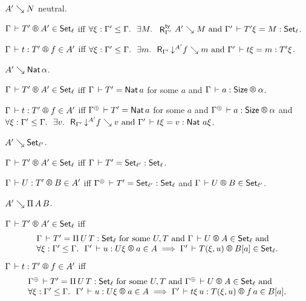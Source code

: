 \documentclass[acmlarge,review,anonymous]{acmart}\settopmatter{printfolios=true}
\begin{document}
\begin{caselist}

\vspace{2ex}
\nextcase $A' \evalsto N$ neutral.

  \noindent
  $\LRT{\Gamma}{T'}{A'}\ell$ iff
  $\forall \xi : \Gamma' \leq \Gamma.\ \ \exists M.\ \ \RTy{\Gamma'}{A'}M \mand \Gamma' \der T'\xi = M : \Set[\ell]$.

  \noindent
  $\LR{\Gamma}{t}{T'}{f}{A'}$ iff
  $\forall \xi : \Gamma' \leq \Gamma.\ \
   \exists m. \ \
   \R {\Gamma'} {\down {A'} f} m \mand
   \Gamma' \der t\xi = m : T'\xi$.

\vspace{2ex}
\nextcase $A' \evalsto \Nat \alpha$.

  \noindent
  $\LRT{\Gamma}{T'}{A'}\ell$ iff $\Gamma \der T' = \Nat a$ for some $a$ and $\LRSize \Gamma a \alpha$.

  \noindent
  $\LR{\Gamma}{t}{T'}{f}{A'}$ iff $\resurrect\Gamma \der T' = \Nat a$ for some $a$ and
  $\LRSize {\resurrect\Gamma} a \alpha$ and \\
  $\forall \xi : \Gamma' \leq \Gamma.\ \
   \exists v. \ \
   \R {\Gamma'} {\down {A'} f} v \mand
   \Gamma' \der t\xi = v : \Nat\,a\xi$.


\vspace{2ex}
\nextcase $A' \evalsto \Set[\ell']$.

  \noindent
  $\LRT {\Gamma} {T'} {A'} \ell$ iff $\Gamma \der T' = \Set[\ell'] : \Set[\ell]$.

  \noindent
  $\LR \Gamma U {T'} B {A'}$ iff
  $\resurrect\Gamma \der T' = \Set[\ell'] : \Set[\ell]$ and $\LRT \Gamma U B {\ell'}$.

\vspace{2ex}
\nextcase $A' \evalsto \piT A B$.

\noindent
$\LRT \Gamma {T'} {A'} \ell$ iff
\[
\begin{array}{l}
\Gamma \der T' = \piT U T : \Set[\ell] \mforsome U, T \mand \LRT \Gamma U A \ell \mand \\
\forall \xi : \Gamma' \leq \Gamma.\ \
\LR {\Gamma'} u {U\xi} a A \implies \LRT {\Gamma'} {T(\xi,u)} {B[a]} \ell
. \\
\end{array}
\]
$\LR \Gamma t {T'} f {A'}$ iff
\[
\begin{array}{l}
\resurrect\Gamma \der T' = \piT U T : \Set[\ell] \mforsome U, T \mand \LRT {\resurrect\Gamma} U A \ell \mand \\
\forall \xi : \Gamma' \leq \Gamma.\ \
\LR {\Gamma'} u {U\xi} a A \implies \LR {\Gamma'} {t\xi\,u} {T(\xi,u)} {f\,a} {B[a]}
.
\end{array}
\]


\end{caselist}
\end{document}
